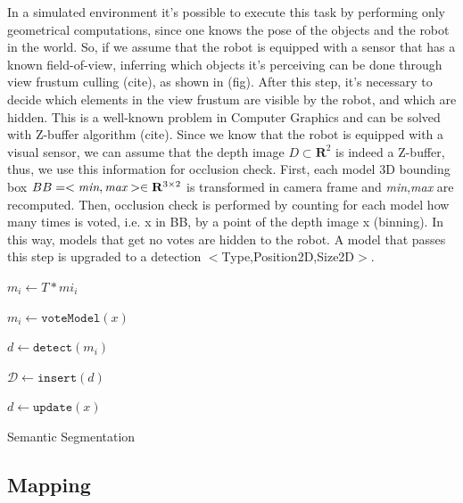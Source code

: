 \documentclass{article}
\begin{document}
	In a simulated environment it's possible to execute this task by performing only geometrical computations, since one knows the pose of the objects and the robot in the world. So, if we assume that the robot is equipped with a sensor that has a known field-of-view, inferring which objects it's perceiving can be done through view frustum culling (cite), as shown in (fig). After this step, it's necessary to decide which elements in the view frustum are visible by the robot, and which are hidden. This is a well-known problem in Computer Graphics and can be solved with Z-buffer algorithm (cite). Since we know that the robot is equipped with a visual sensor, we can assume that the depth image $D \subset \mathbf{R}^2$ is indeed a Z-buffer, thus, we use this information for occlusion check. First, each model 3D bounding box $BB = < \emph{min} ,\emph{max} > \in \mathbf{R}^{3 \times 2}$ is transformed in camera frame and \emph{min},\emph{max} are recomputed. Then, occlusion check is performed by counting for each model how many times is voted, i.e. x in BB, by a point of the depth image x (binning). In this way, models that get no votes are hidden to the robot. A model that passes this step is upgraded to a detection $<$Type,Position2D,Size2D$>$. 
	
	\begin{center}
		\begin{algorithm}[H]
			{
				$m_i \leftarrow T \ast mi_i$\;
			}
			{
				$m_i \leftarrow \texttt{voteModel}(x)$
				
				{
					$d \leftarrow \texttt{detect}(m_i)$
					
					$\mathcal{D} \leftarrow \texttt{insert}(d)$
				}
				
				$d \leftarrow \texttt{update}(x)$
			}
		\caption{Semantic Segmentation}
		\end{algorithm}
	\end{center}
	
	\subsection{Mapping}
	
\end{document}
